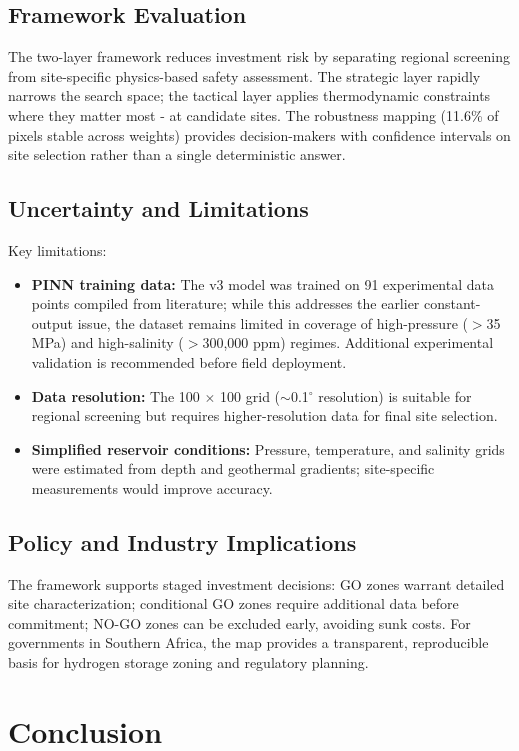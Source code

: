 \documentclass[11pt]{article}
\begin{document}
\subsection{Framework Evaluation}
The two-layer framework reduces investment risk by separating regional screening from site-specific physics-based safety assessment. The strategic layer rapidly narrows the search space; the tactical layer applies thermodynamic constraints where they matter most - at candidate sites. The robustness mapping (11.6\% of pixels stable across weights) provides decision-makers with confidence intervals on site selection rather than a single deterministic answer.

\subsection{Uncertainty and Limitations}
Key limitations:
\begin{itemize}
    \item \textbf{PINN training data:} The v3 model was trained on 91 experimental data points compiled from literature; while this addresses the earlier constant-output issue, the dataset remains limited in coverage of high-pressure ($>$35 MPa) and high-salinity ($>$300,000 ppm) regimes. Additional experimental validation is recommended before field deployment.
    \item \textbf{Data resolution:} The 100 $\times$ 100 grid ($\sim$0.1$^\circ$ resolution) is suitable for regional screening but requires higher-resolution data for final site selection.
    \item \textbf{Simplified reservoir conditions:} Pressure, temperature, and salinity grids were estimated from depth and geothermal gradients; site-specific measurements would improve accuracy.
\end{itemize}

\subsection{Policy and Industry Implications}
The framework supports staged investment decisions: GO zones warrant detailed site characterization; conditional GO zones require additional data before commitment; NO-GO zones can be excluded early, avoiding sunk costs. For governments in Southern Africa, the map provides a transparent, reproducible basis for hydrogen storage zoning and regulatory planning.

\section{Conclusion}
\end{document}
